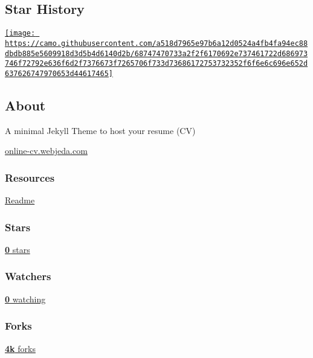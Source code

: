 \documentclass[
  english,
]{article}
\begin{document}
\hypertarget{star-history}{%
\subsection[Star
History]{\texorpdfstring{\protect\hypertarget{user-content-star-history}{\protect\hyperlink{star-history}{}}Star
History}{Star History}}\label{star-history}}

\href{https://star-history.com/\#sharu725/online-cv\&Date}{\texttt{[image: https://camo.githubusercontent.com/a518d7965e97b6a12d0524a4fb4fa94ec88dbdb885e5609918d3d5b4d6140d2b/68747470733a2f2f6170692e737461722d686973746f72792e636f6d2f7376673f7265706f733d73686172753732352f6f6e6c696e652d637626747970653d44617465]}}

\hypertarget{about}{%
\subsection{About}\label{about}}

A minimal Jekyll Theme to host your resume (CV)

{ \href{https://online-cv.webjeda.com}{online-cv.webjeda.com} }

\hypertarget{resources}{%
\subsubsection{Resources}\label{resources}}

\protect\hyperlink{readme}{ Readme}

\hypertarget{stars}{%
\subsubsection{Stars}\label{stars}}

\href{/CptMike/online-cv/stargazers}{ \textbf{0} stars}

\hypertarget{watchers}{%
\subsubsection{Watchers}\label{watchers}}

\href{/CptMike/online-cv/watchers}{ \textbf{0} watching}

\hypertarget{forks}{%
\subsubsection{Forks}\label{forks}}

\href{/CptMike/online-cv/network/members}{ \textbf{4k} forks}
\end{document}
